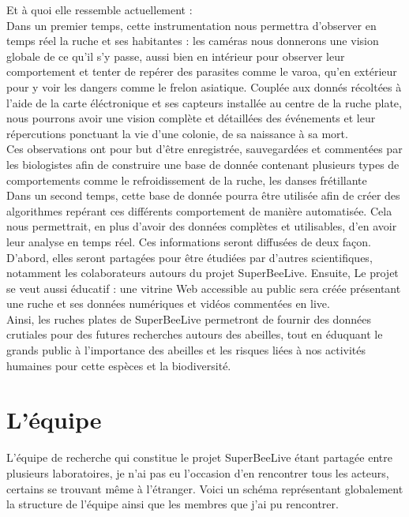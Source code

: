 \documentclass[11pt,french,a4paper]{report}
\begin{document}

Et à quoi elle ressemble actuellement : \\


Dans un premier temps, cette instrumentation nous permettra d'observer en temps réel la ruche et ses habitantes : 
les caméras nous donnerons une vision globale de ce qu'il s'y passe, aussi bien en intérieur pour observer leur 
comportement et tenter de repérer des parasites comme le varoa, qu'en extérieur pour y voir les dangers comme le frelon asiatique. %
Couplée aux donnés récoltées à l'aide de la carte éléctronique et ses capteurs installée au centre de la ruche plate, 
nous pourrons avoir une vision complète et détaillées des événements et leur répercutions ponctuant la vie d'une colonie,
de sa naissance à sa mort. \\
Ces observations ont pour but d'être enregistrée, sauvegardées et commentées par les biologistes afin de construire une base
de donnée contenant plusieurs types de comportements comme le refroidissement de la ruche, les danses frétillante %
\\
Dans un second temps, cette base de donnée pourra être utilisée afin de créer des algorithmes repérant ces différents comportement
de manière automatisée. Cela nous permettrait, en plus d'avoir des données complètes et utilisables, d'en avoir leur analyse en 
temps réel. Ces informations seront diffusées de deux façon. D'abord, elles seront partagées pour être étudiées par d'autres scientifiques, 
notamment les colaborateurs autours du projet SuperBeeLive. Ensuite, Le projet se veut aussi éducatif : une vitrine Web accessible au public 
sera créée présentant une ruche et ses données numériques et vidéos commentées en live. \\

Ainsi, les ruches plates de SuperBeeLive permetront de fournir des données crutiales pour des futures recherches autours des abeilles, tout en 
éduquant le grands public à l'importance des abeilles et les risques liées à nos activités humaines pour cette espèces et la biodiversité. 

\section{L'équipe}
L'équipe de recherche qui constitue le projet SuperBeeLive étant partagée entre plusieurs laboratoires, je n'ai pas eu l'occasion
d'en rencontrer tous les acteurs, certains se trouvant même à l'étranger. Voici un schéma représentant globalement la structure
de l'équipe ainsi que les membres que j'ai pu rencontrer. \\
\end{document}

